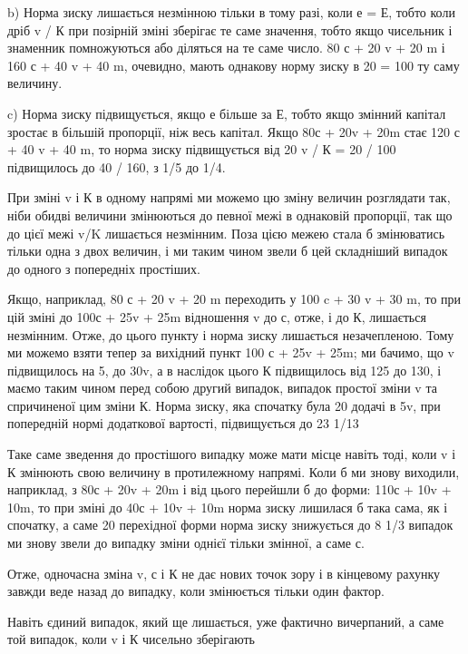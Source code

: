 b) Норма зиску лишається незмінною тільки в тому разі, коли
е = Е, тобто коли дріб v / К при позірній зміні зберігає те саме
значення, тобто якщо чисельник і знаменник помножуються або
діляться на те саме число. 80 с + 20 v + 20 m і 160 с + 40 v + 40 m,
очевидно, мають однакову норму зиску в 20%
= 100%
ту саму величину.

c) Норма зиску підвищується, якщо е більше за Е, тобто
якщо змінний капітал зростає в більшій пропорції, ніж весь капітал.
Якщо 80с + 20v + 20m стає 120 с + 40 v + 40 m, то норма
зиску підвищується від 20%
v / К = 20 / 100 підвищилось до 40 / 160, з 1/5 до 1/4.

При зміні v і К в одному напрямі ми можемо цю зміну величин
розглядати так, ніби обидві величини змінюються до певної
межі в однаковій пропорції, так що до цієї межі v/K лишається
незмінним. Поза цією межею стала б змінюватись тільки
одна з двох величин, і ми таким чином звели б цей складніший
випадок до одного з попередніх простіших.

Якщо, наприклад, 80 с + 20 v + 20 m переходить у 100 c +
30 v + 30 m, то при цій зміні до 100с + 25v + 25m відношення
v до с, отже, і до К, лишається незмінним. Отже, до цього
пункту і норма зиску лишається незачепленою. Тому ми можемо
взяти тепер за вихідний пункт 100 с + 25v + 25m; ми бачимо,
що v підвищилось на 5, до 30v, а в наслідок цього К підвищилось
від 125 до 130, і маємо таким чином перед собою другий
випадок, випадок простої зміни v та спричиненої цим
зміни К. Норма зиску, яка спочатку була 20%
додачі в 5v, при попередній нормі додаткової вартості, підвищується
до 23 1/13%

Таке саме зведення до простішого випадку може мати місце
навіть тоді, коли v і К змінюють свою величину в протилежному
напрямі. Коли б ми знову виходили, наприклад, з 80с + 20v +
20m і від цього перейшли б до форми: 110с + 10v + 10m, то
при зміні до 40с + 10v + 10m норма зиску лишилася б така
сама, як і спочатку, а саме 20%
перехідної форми норма зиску знижується до 8 1/3%
випадок ми знову звели до випадку зміни однієї тільки змінної,
а саме с.

Отже, одночасна зміна v, с і К не дає нових точок зору і в
кінцевому рахунку завжди веде назад до випадку, коли змінюється
тільки один фактор.

Навіть єдиний випадок, який ще лишається, уже фактично
вичерпаний, а саме той випадок, коли v і К чисельно зберігають

